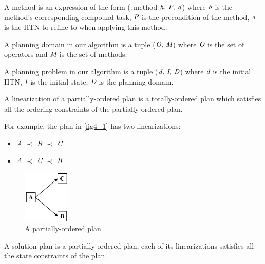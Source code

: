 \begin{definition}[Method]
A method is an expression of the form ($:$method $\emph{h, P, d}$) where $\emph{h}$ is the method's corresponding compound task, $\emph{P}$ is the precondition of the method, $\emph{d}$ is the HTN to refine to when applying this method.
\end{definition}

\begin{definition}
A planning domain in our algorithm is a tuple ($\emph{O, M}$) where $\emph{O}$ is the set of operators and $\emph{M}$ is the set of methods.
\end{definition}


\begin{definition}
A planning problem in our algorithm is a tuple ($\emph{d, I, D}$) where $\emph{d}$ is the initial HTN, $\emph{I}$ is the initial state, $\emph{D}$ is the planning domain.
\end{definition}


\begin{definition}[Linearization]
A linearization of a partially-ordered plan is a totally-ordered plan which satisfies all the ordering constraints of the partially-ordered plan.
\end{definition}

For example, the plan in \autoref{fig4_1} has two linearizations:
\begin{itemize}
\item[] $\emph{A}$ $\prec$ $\emph{B}$ $\prec$ $\emph{C}$
\item[] $\emph{A}$ $\prec$ $\emph{C}$ $\prec$ $\emph{B}$
\end{itemize}

\begin{figure}[H]
    \center
    \includegraphics[width=0.2\textwidth]{./images/4_1.png}
    \caption{A partially-ordered plan}
    \label{fig4_1}
\end{figure}

\begin{definition}
A solution plan is a partially-ordered plan, each of its linearizations satisfies all the state constraints of the plan.
\end{definition}

